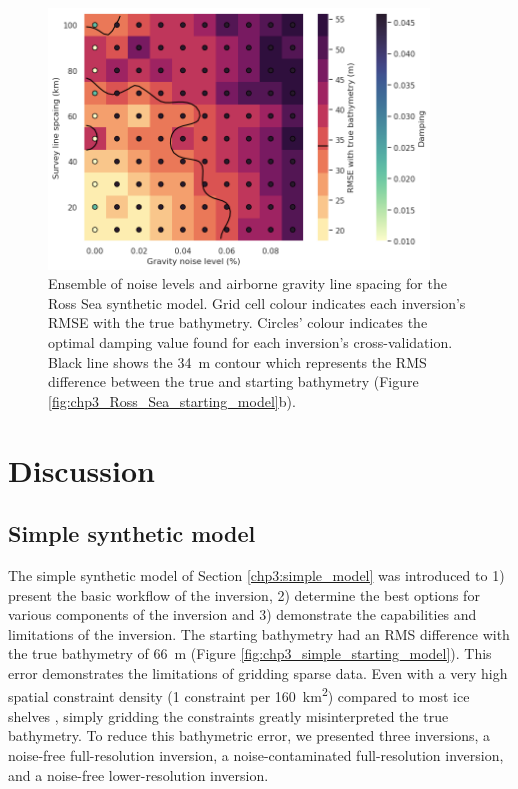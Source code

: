 \begin{figure}[!ht]
    \centering
    \includegraphics[width=0.9\textwidth]{figures/chp3/chp3_Ross_Sea_gravity_ensemble.png}
    \caption[Ross Sea ensemble of noise levels and gravity spacing]{Ensemble of noise levels and airborne gravity line spacing for the Ross Sea synthetic model. Grid cell colour indicates each inversion's RMSE with the true bathymetry. Circles' colour indicates the optimal damping value found for each inversion's cross-validation. Black line shows the 34~m contour which represents the RMS difference between the true and starting bathymetry (Figure \ref{fig:chp3_Ross_Sea_starting_model}b).}
    \label{fig:chp3_Ross_Sea_gravity_ensemble}
\end{figure}


\section{Discussion}

\subsection{Simple synthetic model}

The simple synthetic model of Section \ref{chp3:simple_model} was introduced to 1) present the basic workflow of the inversion, 2) determine the best options for various components of the inversion and 3) demonstrate the capabilities and limitations of the inversion. The starting bathymetry had an RMS difference with the true bathymetry of 66~m (Figure \ref{fig:chp3_simple_starting_model}). This error demonstrates the limitations of gridding sparse data. Even with a very high spatial constraint density (1 constraint per 160~km\textsuperscript{2}) compared to most ice shelves \citep{fretwellbedmap22013}, simply gridding the constraints greatly misinterpreted the true bathymetry. To reduce this bathymetric error, we presented three inversions, a noise-free full-resolution inversion, a noise-contaminated full-resolution inversion, and a noise-free lower-resolution inversion.

